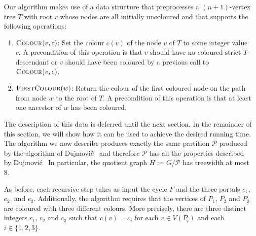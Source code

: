 \documentclass[kpfonts]{patmorin}
\begin{document}
Our algorithm makes use of a data structure that preprocesses a $(n+1)$-vertex tree $T$ with root $r$ whose nodes are all initially uncoloured and that supports the following operations:
\begin{enumerate}
   \item $\textsc{Colour}(v,c)$: Set the colour $c(v)$ of the node $v$ of $T$ to some integer value $c$.  A precondition of this operation is that $v$ should have no coloured strict $T$-descendant or $v$ should have been coloured by a previous call to $\textsc{Colour}(v,c)$.

   \item $\textsc{FirstColour}(w)$: Return the colour of the first coloured node on the path from node $w$ to the root of $T$.  A precondition of this operation is that at least one ancestor of $w$ has been coloured.
\end{enumerate}
 The description of this data is deferred until the next section.  In the remainder of this section, we will show how it can be used to achieve the desired running time.  The algorithm we now describe produces exactly the same partition $\mathcal{P}$ produced by the algorithm of Dujmović \etal\ and therefore $\mathcal{P}$ has all the properties described by Dujmović \etal\   In particular, the quotient graph $H:=G/\mathcal{P}$ has treewidth at most $8$.

As before, each recursive step takes as input the cycle $F$ and the three portals $e_1$, $e_2$, and $e_3$.  Additionally, the algorithm requires that the vertices of $P_1$, $P_2$ and $P_3$ are coloured with three different colours.  More precisely, there are three distinct integers $c_1$, $c_2$ and $c_3$ such that $c(v)=c_i$ for each $v\in V(P_i)$ and each $i\in\{1,2,3\}$.
\end{document}
